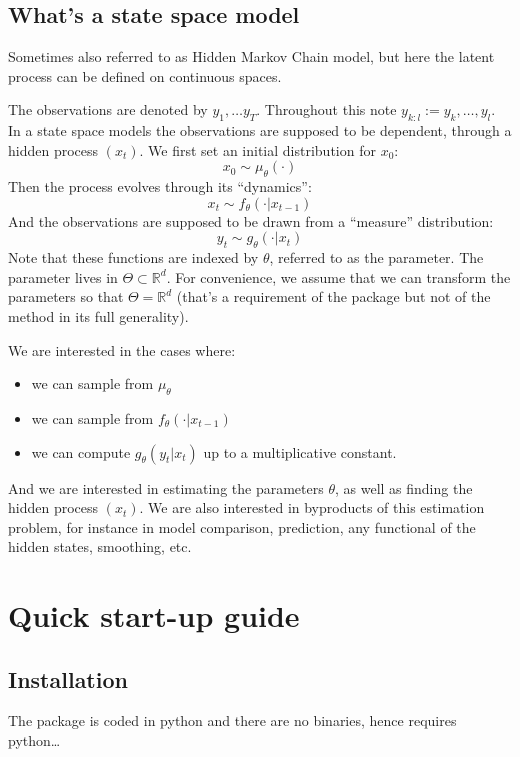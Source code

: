 \documentclass[a4paper,10pt]{paper}
\begin{document}
\subsection{What's a state space model}

Sometimes also referred to as Hidden Markov Chain model, but here the latent process can be defined on continuous spaces.

The observations are denoted by $y_1, \ldots y_T$. Throughout this note $y_{k:l} := y_k, \ldots, y_l$.
In a state space models the observations are supposed to be dependent, through a hidden process $(x_t)$. We first set 
an initial distribution for $x_0$:
\[x_0 \sim \mu_\theta(\cdot)\]
Then the process evolves through its ``dynamics'':
\[x_t \sim f_\theta(\cdot \vert x_{t-1})\]
And the observations are supposed to be drawn from a ``measure'' distribution:
\[y_t \sim g_\theta(\cdot \vert x_t)\]
Note that these functions are indexed by $\theta$, referred to as the parameter. The parameter lives in $\Theta \subset \mathbb{R}^d$.
For convenience, we assume that we can transform the parameters so that $\Theta = \mathbb{R}^d$ (that's a requirement of the package
but not of the method in its full generality).

We are interested in the cases where:
\begin{itemize}
 \item we can sample from $\mu_\theta$
 \item we can sample from $f_\theta(\cdot \vert x_{t-1})$
 \item we can compute $g_\theta(y_t\vert x_t)$ up to a multiplicative constant.
\end{itemize}

And we are interested in estimating the parameters $\theta$, as well as finding the hidden process $(x_t)$. We are also interested
in byproducts of this estimation problem, for instance in model comparison, prediction, any functional of the hidden states, smoothing, etc. 

\section{Quick start-up guide}

\subsection{Installation}

The package is coded in python and there are no binaries, hence requires python\ldots
\end{document}
